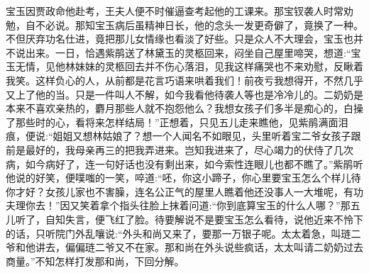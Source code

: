 \begin{parag}
    宝玉因贾政命他赴考，王夫人便不时催逼查考起他的工课来。那宝钗袭人时常劝勉，自不必说。那知宝玉病后虽精神日长，他的念头一发更奇僻了，竟换了一种。不但厌弃功名仕进，竟把那儿女情缘也看淡了好些。只是众人不大理会，宝玉也并不说出来。一日，恰遇紫鹃送了林黛玉的灵柩回来，闷坐自己屋里啼哭，想道:“宝玉无情，见他林妹妹的灵柩回去并不伤心落泪，见我这样痛哭也不来劝慰，反瞅着我笑。这样负心的人，从前都是花言巧语来哄着我们！前夜亏我想得开，不然几乎又上了他的当。只是一件叫人不解，如今我看他待袭人等也是冷冷儿的。二奶奶是本来不喜欢亲热的，麝月那些人就不抱怨他么？我想女孩子们多半是痴心的，白操了那些时的心，看将来怎样结局！”正想着，只见五儿走来瞧他，见紫鹃满面泪痕，便说:“姐姐又想林姑娘了？想一个人闻名不如眼见，头里听着宝二爷女孩子跟前是最好的，我母亲再三的把我弄进来。岂知我进来了，尽心竭力的伏侍了几次病，如今病好了，连一句好话也没有剩出来，如今索性连眼儿也都不瞧了。”紫鹃听他说的好笑，便噗嗤的一笑，啐道:“呸，你这小蹄子，你心里要宝玉怎么个样儿待你才好？女孩儿家也不害臊，连名公正气的屋里人瞧着他还没事人一大堆呢，有功夫理你去！”因又笑着拿个指头往脸上抹着问道:“你到底算宝玉的什么人哪？”那五儿听了，自知失言，便飞红了脸。待要解说不是要宝玉怎么看待，说他近来不怜下的话，只听院门外乱嚷说:“外头和尚又来了，要那一万银子呢。太太着急，叫琏二爷和他讲去，偏偏琏二爷又不在家。那和尚在外头说些疯话，太太叫请二奶奶过去商量。”不知怎样打发那和尚，下回分解。
\end{parag}